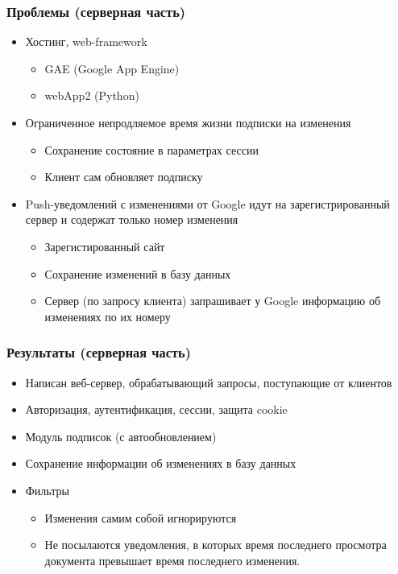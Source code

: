 \documentclass[10pt,pdf,hyperref={unicode}]{beamer}
\begin{document}
    \begin{frame}\frametitle{Проблемы (серверная часть)}
        \begin{itemize}%
	        \item	Хостинг, web-framework
	        \pause
            \begin{itemize}
                \item GAE (Google App Engine)
                \item webApp2 (Python)       
            \end{itemize}
	        \pause
            \item	Ограниченное непродляемое время жизни подписки на изменения
	        \pause
            \begin{itemize}
                \item Сохранение состояние в параметрах сессии
                \item Клиент сам обновляет подписку
            \end{itemize}
	        \pause
            \item	Push-уведомлений с изменениями от Google идут на зарегистрированный сервер и содержат только номер изменения
	        \pause
            \begin{itemize}
                \item Зарегистированный сайт
                \item Сохранение изменений в базу данных
                \item Сервер (по запросу клиента) запрашивает у Google информацию об изменениях по их номеру
            \end{itemize}
        \end{itemize}
    \end{frame}
    
    \begin{frame}\frametitle{Результаты (серверная часть)}
        \begin{itemize}%
            \item	Написан веб-сервер, обрабатывающий запросы, поступающие от клиентов            
            \item	Авторизация, аутентификация, сессии, защита cookie
	        \pause
            \item	Модуль подписок (с автообновлением)
            \item	Сохранение информации об изменениях в базу данных
	        \pause
            \item	Фильтры
            \begin{itemize}
                \item Изменения самим собой игнорируются
                \item Не посылаются уведомления, в которых время последнего просмотра документа превышает время последнего изменения.
            \end{itemize}

        \end{itemize}
    \end{frame}
    
\end{document}

